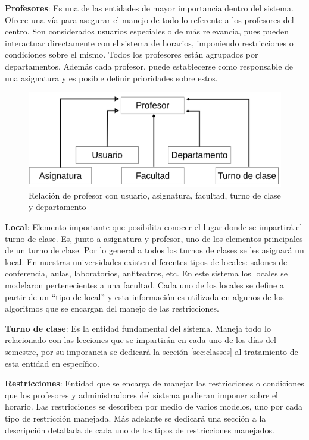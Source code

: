 \textbf{Profesores}: Es una de las entidades de mayor importancia dentro del sistema. Ofrece una vía para asegurar el manejo de todo lo referente a los profesores del centro. Son considerados usuarios especiales o de más relevancia, pues pueden interactuar directamente con el sistema de horarios, imponiendo restricciones o condiciones sobre el mismo. Todos los profesores están agrupados por departamentos. Además cada profesor, puede establecerse como responsable de una asignatura y es posible definir prioridades sobre estos.

\begin{figure}[h!]
	\centering
	\includegraphics[width=0.75\linewidth]{images/Chapter 2/teacher_relation}
	\caption{Relación de profesor con usuario, asignatura, facultad, turno de clase y departamento }
	\label{fig:teacher_relation}
\end{figure}

\textbf{Local}: Elemento importante que posibilita conocer el lugar donde se impartirá el turno de clase. Es, junto a asignatura y profesor, uno de los elementos principales de un turno de clase. Por lo general a todos los turnos de clases se les asignará un local. En nuestras universidades existen diferentes tipos de locales: salones de conferencia, aulas, laboratorios, anfiteatros, etc. En este sistema los locales se modelaron pertenecientes a una facultad. Cada uno de los locales se define a partir de un “tipo de local” y esta información es utilizada en algunos de los algoritmos que se encargan del manejo de las restricciones.

\textbf{Turno de clase}: Es la entidad fundamental del sistema. Maneja todo lo relacionado con las lecciones que se impartirán en cada uno de los días del semestre, por su imporancia se dedicará la sección \ref{sec:classes} al tratamiento de esta entidad en específico.

\textbf{Restricciones}: Entidad que se encarga de manejar las restricciones o condiciones que los profesores y administradores del sistema pudieran imponer sobre el horario. Las restricciones se describen por medio de varios modelos, uno por cada tipo de restricción manejada. Más adelante se dedicará una sección a la descripción detallada de cada uno de los tipos de restricciones manejados.


